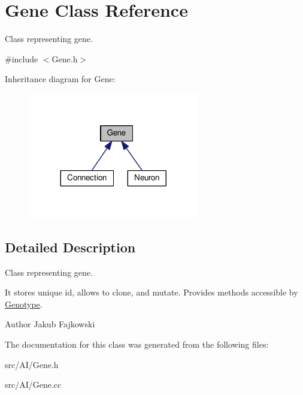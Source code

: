 \hypertarget{classGene}{}\section{Gene Class Reference}
\label{classGene}


Class representing gene.  




{\ttfamily \#include $<$Gene.\+h$>$}



Inheritance diagram for Gene\+:\nopagebreak
\begin{figure}[H]
\begin{center}
\leavevmode
\includegraphics[width=212pt]{classGene__inherit__graph}
\end{center}
\end{figure}


\subsection{Detailed Description}
Class representing gene. 

It stores unique id, allows to clone, and mutate. Provides methods accessible by \hyperlink{classGenotype}{Genotype}. \begin{DoxyAuthor}{Author}
Jakub Fajkowski 
\end{DoxyAuthor}


The documentation for this class was generated from the following files\+:\begin{DoxyCompactItemize}
\item 
src/\+A\+I/Gene.\+h\item 
src/\+A\+I/Gene.\+cc\end{DoxyCompactItemize}
